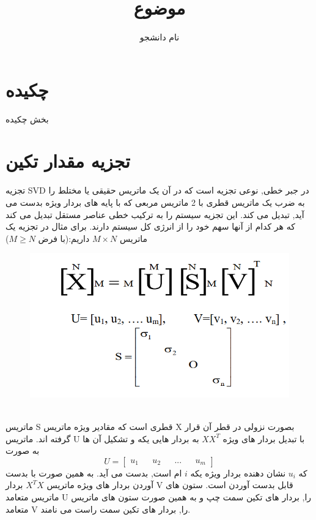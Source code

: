 \documentclass[12pt]{tehranReport}
\title{موضوع}
\author{نام دانشجو}
\begin{document}
\maketitlepage

\tableofcontents
\newpage
\renewcommand{\thesection}{\arabic{section}}
\section*{چکیده}
بخش چکیده 
\newpage
\section{تجزیه مقدار تکین }
تجزیه SVD در جبر خطی, نوعی تجزیه است که در آن یک ماتریس حقیقی یا مختلط را به ضرب یک ماتریس قطری با 2 ماتریس مربعی که با پایه های بردار ویژه بدست می آید, تبدیل می کند. این تجزیه سیستم را به ترکیب خطی عناصر مستقل تبدیل می کند که هر کدام از آنها سهم خود را از انرژی کل سیستم دارند.
برای مثال در تجزیه یک ماتریس $M \times N$ داریم:(با فرض $M \geq N$)
\begin{figure}[h!]
	\centering
	\includegraphics[width=\linewidth, height=0.3\textheight]{pics/1}
\end{figure}\\
ماتریس S قطری است که مقادیر ویژه ماتریس X بصورت  نزولی در قطر آن قرار گرفته اند. ماتریس U با تبدیل بردار های ویژه $X X^T$ به بردار هایی یکه و تشکیل آن ها به صورت 
$$
U = \begin{bmatrix}
	u_1 && u_2 && ... && u_m
\end{bmatrix}
$$ 
که $u_i$ نشان دهنده بردار ویژه یکه $i$ ام است, بدست می آید. به همین صورت با بدست آوردن بردار های ویژه ماتریس $X^T X$ بردار V قابل بدست آوردن است. ستون های ماتریس متعامد U را, بردار های تکین سمت چپ و به همین صورت ستون های ماتریس متعامد V را, بردار های تکین سمت راست می نامند.
\newpage
\end{document}
